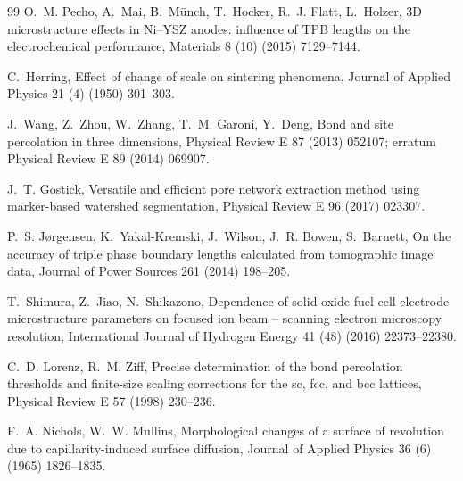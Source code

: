 \documentclass[5p,times,twocolumn]{elsarticle}
\begin{document}
\begin{thebibliography}{99}
O.~M. Pecho, A.~Mai, B.~M\"unch, T.~Hocker, R.~J. Flatt, L.~Holzer,
3D microstructure effects in Ni--YSZ anodes: influence of TPB lengths on the
electrochemical performance,
Materials 8 (10) (2015) 7129--7144.

C.~Herring,
Effect of change of scale on sintering phenomena,
Journal of Applied Physics 21 (4) (1950) 301--303.

J.~Wang, Z.~Zhou, W.~Zhang, T.~M. Garoni, Y.~Deng,
Bond and site percolation in three dimensions,
Physical Review E 87 (2013) 052107; erratum Physical Review E 89 (2014)
069907.

J.~T. Gostick,
Versatile and efficient pore network extraction method using marker-based
watershed segmentation,
Physical Review E 96 (2017) 023307.

P.~S. J{\o}rgensen, K.~Yakal-Kremski, J.~Wilson, J.~R. Bowen, S.~Barnett,
On the accuracy of triple phase boundary lengths calculated from tomographic
image data,
Journal of Power Sources 261 (2014) 198--205.

T.~Shimura, Z.~Jiao, N.~Shikazono,
Dependence of solid oxide fuel cell electrode microstructure parameters on
focused ion beam -- scanning electron microscopy resolution,
International Journal of Hydrogen Energy 41 (48) (2016) 22373--22380.

C.~D. Lorenz, R.~M. Ziff,
Precise determination of the bond percolation thresholds and finite-size
scaling corrections for the sc, fcc, and bcc lattices,
Physical Review E 57 (1998) 230--236.

F.~A. Nichols, W.~W. Mullins,
Morphological changes of a surface of revolution due to capillarity-induced
surface diffusion,
Journal of Applied Physics 36 (6) (1965) 1826--1835.

\end{thebibliography}
\end{document}

